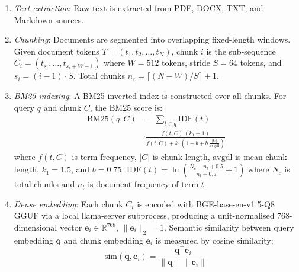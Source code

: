 \documentclass[conference]{IEEEtran}
\begin{document}
\begin{enumerate}
  \item \textit{Text extraction}: Raw text is extracted from PDF, DOCX, TXT,
        and Markdown sources.

  \item \textit{Chunking}: Documents are segmented into overlapping
        fixed-length windows. Given document tokens $T = (t_1, t_2, \ldots,
        t_N)$, chunk $i$ is the sub-sequence $C_i = (t_{s_i}, \ldots,
        t_{s_i+W-1})$ where $W{=}512$ tokens, stride $S{=}64$ tokens, and
        $s_i = (i-1)\cdot S$. Total chunks $n_c = \lceil (N - W) / S \rceil
        + 1$.

  \item \textit{BM25 indexing}: A BM25 inverted index is constructed over all
        chunks. For query $q$ and chunk $C$, the BM25 score is:
        \begin{equation}
          \begin{split}
            \text{BM25}(q,C) &= \sum_{t \in q} \text{IDF}(t) \\
            &\cdot \frac{f(t,C)\,(k_1{+}1)}{f(t,C)+k_1\!\left(1-b+b\,\tfrac{|C|}{\text{avgdl}}\right)}
          \end{split}
          \label{eq:bm25}
        \end{equation}
        where $f(t,C)$ is term frequency, $|C|$ is chunk length,
        $\text{avgdl}$ is mean chunk length, $k_1{=}1.5$, and $b{=}0.75$.
        $\text{IDF}(t) = \ln\!\left(\frac{N_c - n_t + 0.5}{n_t + 0.5}+1\right)$
        where $N_c$ is total chunks and $n_t$ is document frequency of
        term $t$.

  \item \textit{Dense embedding}: Each chunk $C_i$ is encoded with
        BGE-base-en-v1.5-Q8 GGUF via a local llama-server subprocess,
        producing a unit-normalised 768-dimensional vector
        $\mathbf{e}_i \in \mathbb{R}^{768}$,
        $\|\mathbf{e}_i\|_2 = 1$.
        Semantic similarity between query embedding $\mathbf{q}$ and
        chunk embedding $\mathbf{e}_i$ is measured by cosine similarity:
        \begin{equation}
          \text{sim}(\mathbf{q}, \mathbf{e}_i)
            = \frac{\mathbf{q}^\top \mathbf{e}_i}
                   {\|\mathbf{q}\|\,\|\mathbf{e}_i\|}
          \label{eq:cosine}
        \end{equation}


\end{enumerate}
\end{document}
